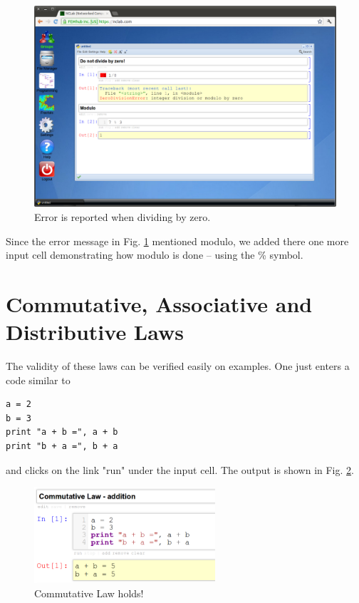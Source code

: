 \documentclass[article,A4,12pt]{llncs}
\begin{document}
\newpage
\begin{figure}[!ht]
\begin{center}
\includegraphics[width=\textwidth]{img/divzero.png}
\end{center}
\caption{Error is reported when dividing by zero.}
\label{fig:divzero}
\end{figure}
\noindent
Since the error message in Fig. \ref{fig:divzero} mentioned modulo, we added there one more 
input cell demonstrating how modulo is done -- using the \% symbol.

\section{Commutative, Associative and Distributive Laws}

The validity of these laws can be verified easily on examples. One just enters
a code similar to 

\begin{verbatim}
a = 2
b = 3
print "a + b =", a + b
print "b + a =", b + a
\end{verbatim}
and clicks on the link "run" under the input cell. The output 
is shown in Fig. \ref{fig:commut}. 

\begin{figure}[!ht]
\begin{center}
\includegraphics[width=0.6\textwidth]{img/commut.png}
\end{center}
\vspace{-4mm}
\caption{Commutative Law holds!}
\label{fig:commut}
\end{figure}
\end{document}
